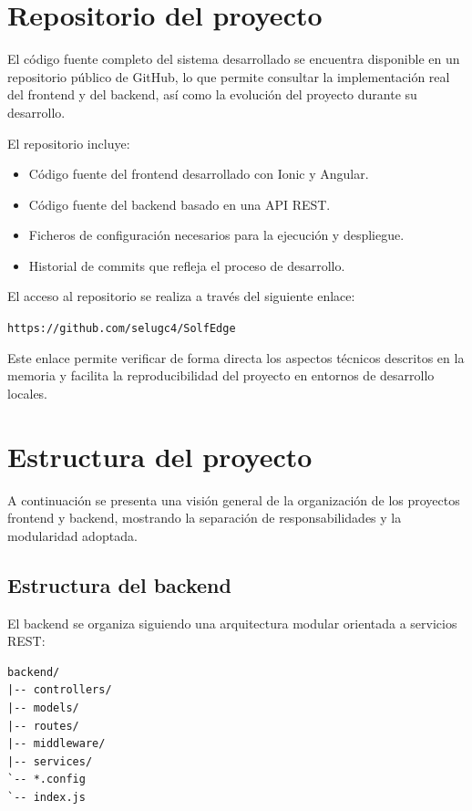 \section{Repositorio del proyecto}

El código fuente completo del sistema desarrollado se encuentra disponible en un repositorio público de GitHub, lo que permite consultar la implementación real del frontend y del backend, así como la evolución del proyecto durante su desarrollo.

El repositorio incluye:
\begin{itemize}
    \item Código fuente del frontend desarrollado con Ionic y Angular.
    \item Código fuente del backend basado en una API REST.
    \item Ficheros de configuración necesarios para la ejecución y despliegue.
    \item Historial de commits que refleja el proceso de desarrollo.
\end{itemize}

El acceso al repositorio se realiza a través del siguiente enlace:

\begin{center}
\texttt{https://github.com/selugc4/SolfEdge}
\end{center}

Este enlace permite verificar de forma directa los aspectos técnicos descritos en la memoria y facilita la reproducibilidad del proyecto en entornos de desarrollo locales.

\section{Estructura del proyecto}

A continuación se presenta una visión general de la organización de los proyectos frontend y backend, mostrando la separación de responsabilidades y la modularidad adoptada.
\newpage
\subsection{Estructura del backend}

El backend se organiza siguiendo una arquitectura modular orientada a servicios REST:

\begin{verbatim}
backend/
|-- controllers/
|-- models/
|-- routes/
|-- middleware/
|-- services/
`-- *.config
`-- index.js
\end{verbatim}

